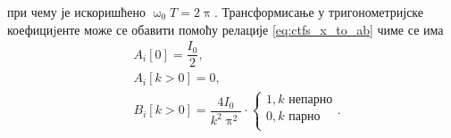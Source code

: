 при чему је искоришћено $\upomega_0 T = 2\uppi$. Трансформисање у тригонометријске коефициjенте може се 
обавити помоћу релације \eqref{eq:ctfs_x_to_ab} чиме се има 
\begin{align}
    & A_i[0] = \dfrac{I_0}{2}, \\
    & A_i[k>0] = 0,  \\
    & B_i[k>0] = \dfrac{4 I_0}{k^2 \uppi^2} \cdot 
    \begin{cases}
        1, k\text{ непарно} \\
        0, k\text{ парно} \\
    \end{cases}.
\end{align}